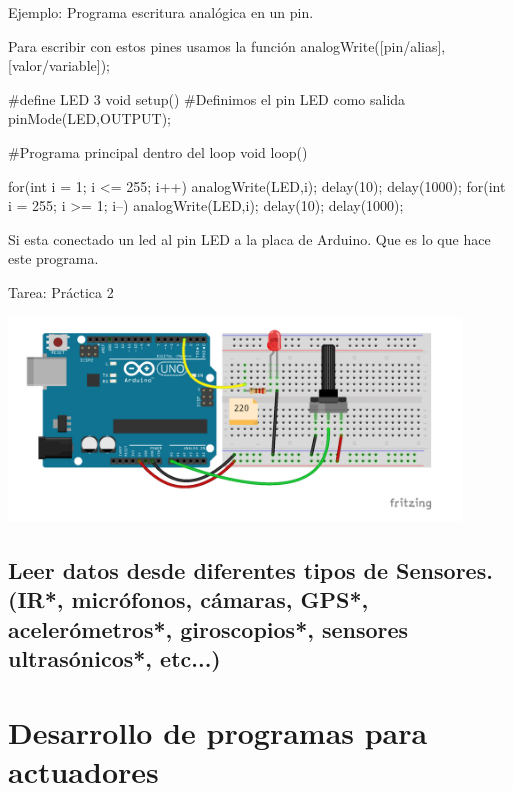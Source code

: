 \documentclass{beamer}
\theoremstyle{definition}
\begin{document}
\begin{frame}[fragile]Ejemplo: Programa escritura analógica en un pin.

Para escribir con estos pines usamos la funci\'{o}n analogWrite([pin/alias],[valor/variable]);

\tiny
\begin{verbatimtab}

#define LED 3
void setup() {
	#Definimos el pin LED como salida 
 	pinMode(LED,OUTPUT); 
}

#Programa principal dentro del loop
void loop() {
	
  for(int i = 1; i <= 255; i++){
    analogWrite(LED,i);
    delay(10);
    }
    delay(1000);
  for(int i = 255; i >= 1; i--){
    analogWrite(LED,i);
    delay(10);
    }
  delay(1000);
}
\end{verbatimtab}

Si esta conectado un led al pin LED a la placa de Arduino. Que es lo que hace este programa.



\end{frame}


\begin{frame}{Tarea: Práctica 2}

\includegraphics[width=0.9\textwidth]{figures/tarea2.png}

\end{frame}




\subsection{Leer datos desde diferentes tipos de Sensores.  (IR*, micrófonos, cámaras, GPS*, acelerómetros*, giroscopios*, sensores ultrasónicos*, etc...)}

\section{Desarrollo de programas para actuadores}
\end{document}
